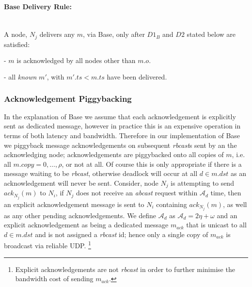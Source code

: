     \paragraph{\textsf{Base} Delivery Rule:}\hspace{0pt} \\
        A node, $N_j$ delivers any $m$, via \textsf{Base}, only after $D1_B$ and $D2$ stated below are satisfied:
        \begin{description}[labelindent=1cm]
            \item[$\boldsymbol{D1_B}$] - $m$ is acknowledged by all nodes other than $m.o$. 
            \item[$\boldsymbol{D2}$] - all \emph{known} $m'$, with $m'.ts < m.ts$ have been delivered.
        \end{description}
    
    \subsubsection*{Acknowledgement Piggybacking}\label{ssec:base_ack_piggyback}
    In the explanation of \textsf{Base} we assume that each acknowledgement is explicitly sent as dedicated message, however in practice this is an expensive operation in terms of both latency and bandwidth.  Therefore in our implementation of \textsf{Base} we piggyback message acknowledgements on subsequent \emph{rbcast}s sent by an the acknowledging node; acknowledgements are piggybacked onto all copies of $m$, i.e. all $m.copy =0,\ldots,\rho$, or not at all.  Of course this is only appropriate if there is a message waiting to be \emph{rbcast}, otherwise deadlock will occur at all $d \in m.dst$ as an acknowledgement will never be sent.  Consider, node $N_j$ is attempting to send $ack_{N_j}(m)$ to $N_i$, if $N_j$ does not receive an \emph{abcast} request within $\mathcal{A}_d$ time, then an explicit acknowledgement message is sent to $N_i$ containing $ack_{N_j}(m)$, as well as any other pending acknowledgements.  We define $\mathcal{A}_d$ as $\mathcal{A}_d = 2\eta + \omega$ and an explicit acknowledgement as being a dedicated message $m_{ack}$ that is unicast to all $d \in m.dst$ and is not assigned a \emph{rbcast} id; hence only a single copy of $m_{ack}$ is broadcast via reliable UDP.  \footnote{Explicit acknowledgements are not \emph{rbcast} in order to further minimise the bandwidth cost of sending $m_{ack}$.}
    

